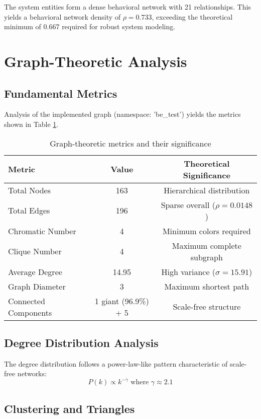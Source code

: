 \documentclass[12pt,a4paper]{article}
\begin{document}
The system entities form a dense behavioral network with 21 relationships. This yields a behavioral network density of $\rho = 0.733$, exceeding the theoretical minimum of $0.667$ required for robust system modeling.

\section{Graph-Theoretic Analysis}

\subsection{Fundamental Metrics}

Analysis of the implemented graph (namespace: 'be\_test') yields the metrics shown in Table \ref{tab:metrics}.

\begin{table}[h]
\centering
\caption{Graph-theoretic metrics and their significance}
\label{tab:metrics}
\begin{tabular}{lcc}
\toprule
\textbf{Metric} & \textbf{Value} & \textbf{Theoretical Significance} \\
\midrule
Total Nodes & 163 & Hierarchical distribution \\
Total Edges & 196 & Sparse overall ($\rho = 0.0148$) \\
Chromatic Number & 4 & Minimum colors required \\
Clique Number & 4 & Maximum complete subgraph \\
Average Degree & 14.95 & High variance ($\sigma = 15.91$) \\
Graph Diameter & 3 & Maximum shortest path \\
Connected Components & 1 giant (96.9\%) + 5 & Scale-free structure \\
\bottomrule
\end{tabular}
\end{table}

\subsection{Degree Distribution Analysis}

The degree distribution follows a power-law-like pattern characteristic of scale-free networks:
\begin{equation}
P(k) \propto k^{-\gamma} \text{ where } \gamma \approx 2.1
\end{equation}

\subsection{Clustering and Triangles}
\end{document}
